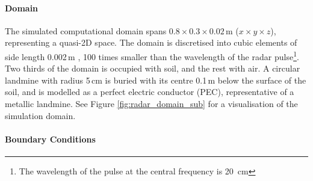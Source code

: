         \paragraph{Domain}

            \noindent The simulated computational domain spans $0.8\times 0.3\times0.02$\,m ($x\times y\times z$), representing a quasi-2D space. The domain is discretised into cubic elements of side length 0.002\,m , 100 times smaller than the wavelength of the radar pulse\footnote{The wavelength of the pulse at the central frequency is 20~cm}. Two thirds of the domain is occupied with soil, and the rest with air. A circular landmine with radius 5\,cm is buried with its centre 0.1\,m below the surface of the soil, and is modelled as a perfect electric conductor (PEC), representative of a metallic landmine. See Figure \ref{fig:radar_domain_sub} for a visualisation of the simulation domain.


        \paragraph{Boundary Conditions}
        
